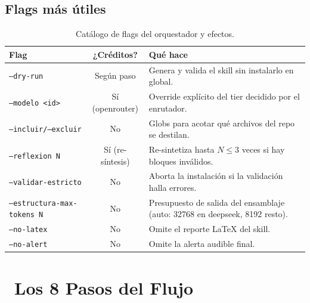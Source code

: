 \documentclass[11pt,a4paper]{article}
\newcommand{\iconotexto}[2]{\textcolor{cyanNeon}{\faIcon{#1}}~#2}
\begin{document}
\subsection{Flags más útiles}
\begin{table}[h!]
\centering
\small
\begin{tabularx}{\linewidth}{>{\ttfamily}p{4.6cm} >{\raggedright\arraybackslash}c >{\raggedright\arraybackslash}X}
\toprule
\rowcolor{azulNoche!12}\textbf{Flag} & \textbf{¿Créditos?} & \textbf{Qué hace} \\
\midrule
\texttt{--dry-run} & Según paso & Genera y valida el skill sin instalarlo en global. \\
\midrule
\texttt{--modelo <id>} & Sí (openrouter) & Override explícito del tier decidido por el enrutador. \\
\midrule
\texttt{--incluir/--excluir} & No & Globs para acotar qué archivos del repo se destilan. \\
\midrule
\texttt{--reflexion N} & Sí (re-síntesis) & Re-sintetiza hasta $N\le3$ veces si hay bloques inválidos. \\
\midrule
\texttt{--validar-estricto} & No & Aborta la instalación si la validación halla errores. \\
\midrule
\texttt{--estructura-max-tokens N} & No & Presupuesto de salida del ensamblaje (auto: 32768 en deepseek, 8192 resto). \\
\midrule
\texttt{--no-latex} & No & Omite el reporte LaTeX del skill. \\
\midrule
\texttt{--no-alert} & No & Omite la alerta audible final. \\
\bottomrule
\end{tabularx}
\caption{Catálogo de flags del orquestador y efectos.}
\end{table}

\section{\iconotexto{list-ol}{Los 8 Pasos del Flujo}}
\end{document}
